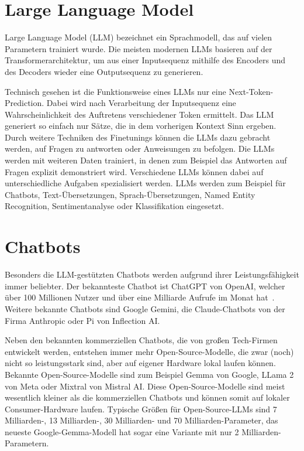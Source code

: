 \section{Large Language Model}

Large Language Model (LLM) bezeichnet ein Sprachmodell, das auf vielen Parametern trainiert wurde.
Die meisten modernen LLMs basieren auf der Transformerarchitektur, um aus einer Inputsequenz mithilfe des Encoders und des Decoders wieder eine Outputsequenz zu generieren.

Technisch gesehen ist die Funktionsweise eines LLMs nur eine Next-Token-Prediction.
Dabei wird nach Verarbeitung der Inputsequenz eine Wahrscheinlichkeit des Auftretens verschiedener Token ermittelt.
Das LLM generiert so einfach nur Sätze, die in dem vorherigen Kontext Sinn ergeben.
Durch weitere Techniken des Finetunings können die LLMs dazu gebracht werden, auf Fragen zu antworten oder Anweisungen zu befolgen.
Die LLMs werden mit weiteren Daten trainiert, in denen zum Beispiel das Antworten auf Fragen explizit demonstriert wird.
Verschiedene LLMs können dabei auf unterschiedliche Aufgaben spezialisiert werden.
LLMs werden zum Beispiel für Chatbots, Text-Übersetzungen, Sprach-Übersetzungen, Named Entity Recognition, Sentimentanalyse oder Klassifikation eingesetzt.

\section{Chatbots}

Besonders die LLM-gestützten Chatbots werden aufgrund ihrer Leistungsfähigkeit immer beliebter.
Der bekannteste Chatbot ist ChatGPT von OpenAI, welcher über 100 Millionen Nutzer und über eine Milliarde Aufrufe im Monat hat~\cite{tong2023}.
Weitere bekannte Chatbots sind Google Gemini, die Claude-Chatbots von der Firma Anthropic oder Pi von Inflection AI.

Neben den bekannten kommerziellen Chatbots, die von großen Tech-Firmen entwickelt werden, entstehen immer mehr Open-Source-Modelle, die zwar (noch) nicht so leistungsstark sind, aber auf eigener Hardware lokal laufen können.
Bekannte Open-Source-Modelle sind zum Beispiel Gemma von Google, LLama 2 von Meta oder Mixtral von Mistral AI.
Diese Open-Source-Modelle sind meist wesentlich kleiner als die kommerziellen Chatbots und können somit auf lokaler Consumer-Hardware laufen.
Typische Größen für Open-Source-LLMs sind 7 Milliarden-, 13 Milliarden-, 30 Milliarden- und 70 Milliarden-Parameter, das neueste Google-Gemma-Modell hat sogar eine Variante mit nur 2 Milliarden-Parametern.


